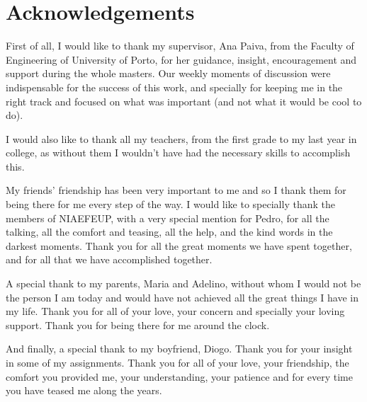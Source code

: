 \chapter*{Acknowledgements}

First of all, I would like to thank my supervisor, Ana Paiva, from the Faculty of Engineering of University of Porto, for her guidance, insight, encouragement and support during the whole masters. Our weekly moments of discussion were indispensable for the success of this work, and specially for keeping me in the right track and focused on what was important (and not what it would be cool to do).

I would also like to thank all my teachers, from the first grade to my last year in college, as without them I wouldn't have had the necessary skills to accomplish this.

My friends’ friendship has been very important to me and so I thank them for being there for me every step of the way. I would like to specially thank the members of NIAEFEUP, with a very special mention for Pedro, for all the talking, all the comfort and teasing, all the help, and the kind words in the darkest moments. Thank you for all the great moments we have spent together, and for all that we have accomplished together.

A special thank to my parents, Maria and Adelino, without whom I would not be the person I am today and would have not achieved all the great things I have in my life. Thank you for all of your love, your concern and specially your loving support. Thank you for being there for me around the clock.

And finally, a special thank to my boyfriend, Diogo. Thank you for your insight in some of my assignments. Thank you for all of your love, your friendship, the comfort you provided me, your understanding, your patience and for every time you have teased me
along the years.

